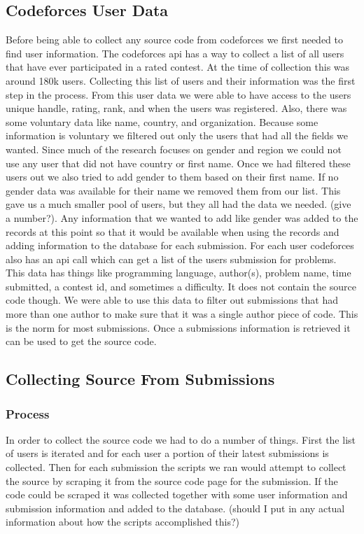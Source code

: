 \documentclass{article}
\begin{document}
\subsection{Codeforces User Data}
Before being able to collect any source code from codeforces we first needed to find user information. The codeforces api has a way to collect a list of all users that have ever participated in a rated contest. At the time of collection this was around 180k users. Collecting this list of users and their information was the first step in the process.
From this user data we were able to have access to the users unique handle, rating, rank, and when the users was registered. Also, there was some voluntary data like name, country, and organization. Because some information is voluntary we filtered out only the users that had all the fields we wanted. Since much of the research focuses on gender and region we could not use any user that did not have country or first name. Once we had filtered these users out we also tried to add gender to them based on their first name. If no gender data was available for their name we removed them from our list. This gave us a much smaller pool of users, but they all had the data we needed. (give a number?). Any information that we wanted to add like gender was added to the records at this point so that it would be available when using the records and adding information to the database for each submission.
For each user codeforces also has an api call which can get a list of the users submission for problems. This data has things like programming language, author(s), problem name, time submitted, a contest id, and sometimes a difficulty. It does not contain the source code though. We were able to use this data to filter out submissions that had more than one author to make sure that it was a single author piece of code. This is the norm for most submissions. Once a submissions information is retrieved it can be used to get the source code.

\subsection{Collecting Source From Submissions}
\subsubsection{Process}
In order to collect the source code we had to do a number of things. First the list of users is iterated and for each user a portion of their latest submissions is collected. Then for each submission the scripts we ran would attempt to collect the source by scraping it from the source code page for the submission. If the code could be scraped it was collected together with some user information and submission information and added to the database. (should I put in any actual information about how the scripts accomplished this?)
\end{document}
